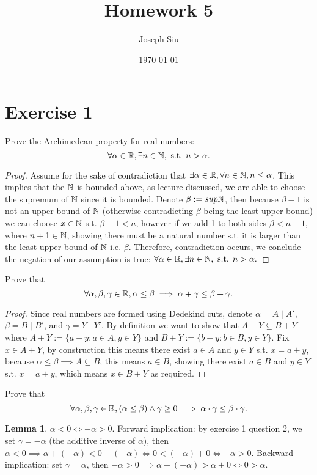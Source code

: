\documentclass{homework}
\author{Joseph Siu}
\date{\today}
\title{Homework 5}
\newcommand{\T}[1]{\text{#1}}
\newcommand{\R}{\bb{R}} %
\newcommand{\N}{\bb{N}} %
\newcommand{\?}{\stackrel{?}{=}}
\theoremstyle{definition}
\newtheorem*{lemma}{Lemma}
\begin{document}
 \maketitle

\section*{Exercise 1}

\question[1] Prove the Archimedean property for real numbers: $$\forall \alpha\in\R,\exists n\in\N, \T{ s.t. } n>\alpha.$$
\begin{proof}
    Assume for the sake of contradiction that $\exists \alpha\in\R, \forall n\in\N, n\leq \alpha$. This implies that the $\N$ is bounded above, as lecture discussed, we are able to choose the supremum of $\N$ since it is bounded. Denote $\beta := sup\N$, then because $\beta-1$ is not an upper bound of $\N$ (otherwise contradicting $\beta$ being the least upper bound) we can choose $x\in\N$ s.t. $\beta-1<n$, however if we add 1 to both sides $\beta<n+1$, where $n+1\in\N$, showing there must be a natural number s.t. it is larger than the least upper bound of $\N$ i.e. $\beta$. Therefore, contradiction occurs, we conclude the negation of our assumption is true: $\forall \alpha\in\R,\exists n\in\N, \T{ s.t. } n>\alpha.$
\end{proof}

\question[2] Prove that $$\forall \alpha, \beta, \gamma\in\R, \alpha\leq\beta\implies\alpha+\gamma\leq\beta+\gamma.$$
\begin{proof}
    Since real numbers are formed using Dedekind cuts, denote $\alpha=A\mid A'$, $\beta=B\mid B'$, and $\gamma= Y\mid Y'$. By definition we want to show that $A+Y\subseteq B+Y$ where $A+Y:=\{a+y:a\in A, y\in Y\}$ and $B+Y := \{b+y:b\in B, y\in Y\}$. Fix $x\in A+Y$, by construction this means there exist $a\in A$ and $y\in Y$ s.t. $x=a+y$, because $\alpha\leq\beta\implies A\subseteq B$, this means $a\in B$, showing there exist $a\in B$ and $y\in Y$ s.t. $x=a+y$, which means $x\in B+Y$ as required. 
\end{proof}


\question[3] Prove that $$\forall\alpha,\beta,\gamma\in\R,(\alpha\leq\beta)\land\gamma\geq0\implies\alpha\cdot\gamma\leq\beta\cdot\gamma.$$

\begin{lemma}
     \underline{$\alpha<0\iff -\alpha>0$}. Forward implication: by exercise 1 question 2, we set $\gamma=-\alpha$ (the additive inverse of $\alpha$), then $\alpha<0\implies \alpha+(-\alpha)<0+(-\alpha)\iff 0<(-\alpha)+0\iff -\alpha>0$. Backward implication: set $\gamma=\alpha$, then $-\alpha>0\implies \alpha+(-\alpha)>\alpha+0\iff 0>\alpha$. 
 \end{lemma}
\end{document}
